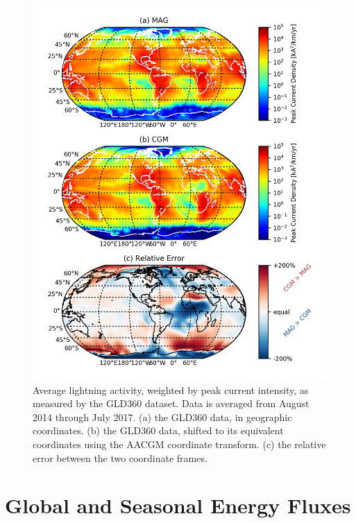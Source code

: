 \begin{figure}[]
\begin{center}
\includegraphics{figures/GLD_CGM_vs_MAG_comparison.png}
\caption[GLD average peak current density, adjusted using AACGM coordinates]{Average lightning activity, weighted by peak current intensity, as measured by the GLD360 dataset. Data is averaged from August 2014 through July 2017. (a) the GLD360 data, in geographic coordinates. (b) the GLD360 data, shifted to its equivalent coordinates using the AACGM coordinate transform. (c) the relative error between the two coordinate frames.}
\label{fig:CGM_vs_MAG_GLD}
\end{center}
\end{figure}




\section{Global and Seasonal Energy Fluxes}

